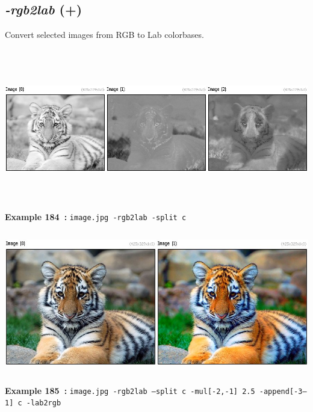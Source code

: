 \documentclass[a4paper,11pt,twoside]{book}
\begin{document}
\subsection{\emph{-rgb2lab} (+)}\vspace*{-0.5em}
Convert selected images from RGB to Lab colorbases.
\begin{center}\includegraphics[keepaspectratio=true,height=7cm,width=\textwidth]{img/gmic_def184.jpg}\\
{\footnotesize \textbf{Example 184~:} \texttt{image.jpg -rgb2lab -split c}}
\\\includegraphics[keepaspectratio=true,height=7cm,width=\textwidth]{img/gmic_def185.jpg}\\
{\footnotesize \textbf{Example 185~:} \texttt{image.jpg -rgb2lab --split c -mul[-2,-1] 2.5 -append[-3--1] c -lab2rgb}}
\end{center}
\end{document}
